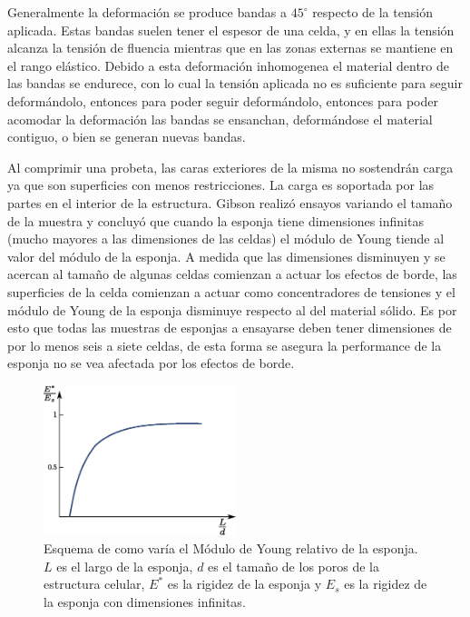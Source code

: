 \documentclass[a4paper,12pt,fleqn,twoside,openany]{book}
\begin{document}
Generalmente la deformación se produce bandas a $45^\circ$ respecto de la tensión aplicada. Estas bandas suelen tener el espesor de una celda, 
y en ellas la tensión alcanza la tensión de fluencia mientras que en las zonas externas se mantiene en el rango elástico. Debido a esta deformación inhomogenea el material dentro de las bandas se endurece, con lo cual la tensión aplicada no es suficiente para seguir deformándolo, entonces para poder seguir deformándolo, entonces para poder acomodar la deformación las bandas se ensanchan, deformándose el material contiguo, o bien se generan nuevas bandas.     


Al comprimir una probeta, las caras exteriores de la misma no sostendrán carga ya que son superficies con menos restricciones.
La carga es soportada por las partes en el interior de la estructura. Gibson \cite{gibson} realizó ensayos variando el tamaño de la muestra 
y concluyó que cuando la esponja tiene 
dimensiones infinitas (mucho mayores a las dimensiones de las celdas) el módulo de Young tiende al valor del módulo de la esponja. A medida que 
las dimensiones disminuyen y se acercan al tamaño de algunas celdas comienzan a actuar los efectos 
de borde, las superficies de la celda comienzan a actuar como concentradores de tensiones y el módulo de Young de la esponja disminuye respecto al del 
material sólido. Es por esto que todas las muestras de esponjas a ensayarse deben tener dimensiones de por lo menos seis a siete celdas, de esta 
forma se asegura la performance de la esponja no se vea afectada por los efectos de borde.


\begin{figure}[h]
 \centering
 \includegraphics[width=0.5\textwidth]{Etam.eps}
 \caption{Esquema de como varía el Módulo de Young relativo de la esponja. $L$ es el largo de la esponja, $d$ es el tamaño de los poros de 
 la estructura celular, $E^*$ es la rigidez de la esponja y $E_s$ es la rigidez de la esponja con dimensiones infinitas.}
\end{figure}
\end{document}
